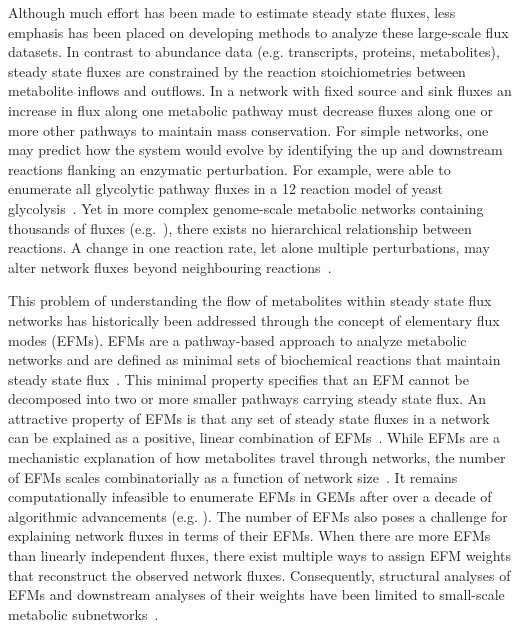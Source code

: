 \documentclass[12pt]{article}
\begin{document}
Although much effort has been made to estimate steady state fluxes, less
emphasis has been placed on developing methods to analyze these
large-scale flux datasets. In contrast to abundance data (e.g.
transcripts, proteins, metabolites), steady state fluxes are constrained
by the reaction stoichiometries between metabolite inflows and outflows.
In a network with fixed source and sink fluxes an increase in flux along
one metabolic pathway must decrease fluxes along one or more other
pathways to maintain mass conservation. For simple networks, one may
predict how the system would evolve by identifying the up and downstream
reactions flanking an enzymatic perturbation. For example,
\citeauthor{SchwartzJean-Marc2006Qema} were able to
enumerate all glycolytic pathway fluxes in a 12 reaction model of yeast
glycolysis~\citep{SchwartzJean-Marc2006Qema}. Yet in more complex genome-scale
metabolic networks containing thousands of fluxes
(e.g.~\cite{BrunkElizabeth2018Reat,RobinsonJonathanL2020Aaoh,WangHao2021Gmnr}),
there exists no hierarchical relationship between reactions. A change in one
reaction rate, let alone multiple perturbations, may alter network fluxes
beyond neighbouring reactions~\citep{NobileMarcoS2021Agsa}.

This problem of understanding the flow of metabolites within steady state
flux networks has historically been addressed through the concept of
elementary flux modes (EFMs). EFMs are a pathway-based approach to analyze
metabolic networks and are defined as minimal sets of biochemical
reactions that maintain steady state flux~\citep{SchusterStefan1994Oefm}.
This minimal property specifies that an EFM cannot be decomposed into two
or more smaller pathways carrying steady state flux. An attractive
property of EFMs is that any set of steady state fluxes in a network can
be explained as a positive, linear combination of
EFMs~\citep{SchusterStefan1999Doef}. While EFMs are a mechanistic
explanation of how metabolites travel through networks, the number of EFMs
scales combinatorially as a function of network
size~\citep{AcunaVicente2009Maci}. It remains computationally infeasible
to enumerate EFMs in GEMs after over a decade of algorithmic advancements
(e.g.
\citealt{GagneurJulien2004Coem,TerzerMarco2008Lcoe,BuchnerBiancaA2021EaPp}).
The number of EFMs also poses a challenge for explaining network fluxes in
terms of their EFMs. When there are more EFMs than linearly independent
fluxes, there exist multiple ways to assign EFM weights that reconstruct
the observed network fluxes. Consequently, structural analyses of EFMs and
downstream analyses of their weights have been limited to small-scale
metabolic
subnetworks~\citep{FakihIbrahim2023Dgmm,MpabanziLiliane2022Frca,ToyaYoshihiro2022Mpef,MatsudaFumio2011Esoy,SchwartzJean-Marc2006Qema}.
\end{document}

